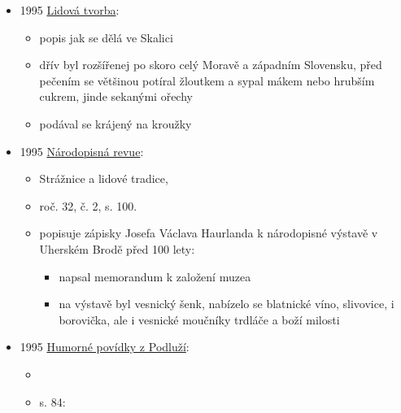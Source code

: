 \begin{itemize}
  \begin{itemize}
  \tightlist
  \item
    \emph{Slovácko na národopisné výstavě v Praze 1895},
  \item
    uherskobrodská výstava, k ochutnání byly nabízeny trdláče a boží
    milosti
  \end{itemize}
\item
  1995
  \href{https://ceskadigitalniknihovna.cz/uuid/uuid:3cd53df2-ab22-431c-b169-618cc63f3ce6}{Lidová
  tvorba}:

  \begin{itemize}
  \tightlist
  \item
    popis jak se dělá ve Skalici
  \item
    dřív byl rozšířenej po skoro celý Moravě a západním Slovensku, před
    pečením se většinou potíral žloutkem a sypal mákem nebo hrubším
    cukrem, jinde sekanými ořechy
  \item
    podával se krájený na kroužky
  \end{itemize}
\item
  1995
  \href{https://ceskadigitalniknihovna.cz/uuid/uuid:1c6aa6b1-52e8-11e5-9a33-5ef3fc9ae867}{Národopisná
  revue}:

  \begin{itemize}
  \tightlist
  \item
    Strážnice a lidové tradice,
  \item
    roč. 32, č. 2, s. 100.
  \item
    popisuje zápisky Josefa Václava Haurlanda k národopisné výstavě v
    Uherském Brodě před 100 lety:

    \begin{itemize}
    \tightlist
    \item
      napsal memorandum k založení muzea
    \item
      na výstavě byl vesnický šenk, nabízelo se blatnické víno,
      slivovice, i borovička, ale i vesnické moučníky trdláče a boží
      milosti
    \end{itemize}
  \end{itemize}
\item
  1995
  \href{https://www.digitalniknihovna.cz/mzk/uuid/uuid:9be24ff0-3261-11ed-aab1-005056827e51}{Humorné
  povídky z Podluží}:

  \begin{itemize}
  \tightlist
  \item
  \item
    s. 84:


\end{itemize}
\end{itemize}
